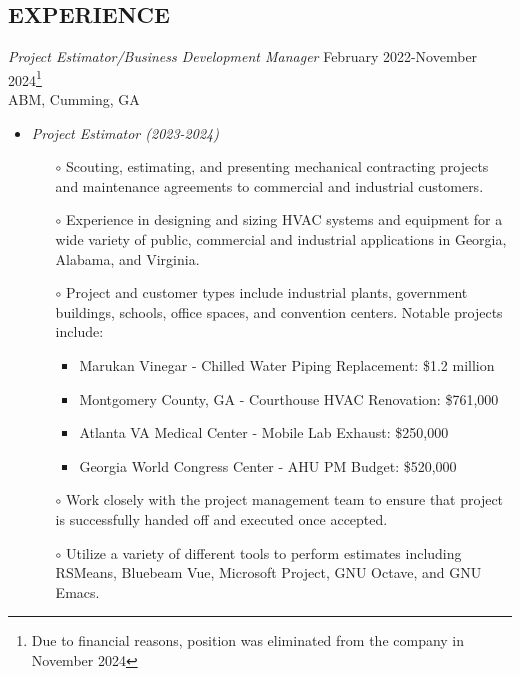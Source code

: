 \documentclass[margin]{res}
\begin{document}
\begin{resume}
\section{EXPERIENCE} 
    {\sl Project Estimator/Business Development Manager} \hfill February 2022-November 2024\footnote{Due to financial reasons, position was eliminated from the company in November 2024} \\
    ABM, Cumming, GA
    \begin{itemize}  \itemsep -2pt %
    \item {\sl Project Estimator (2023-2024)}
      \begin{itemize}
            \item[$\circ$] Scouting, estimating, and presenting mechanical contracting projects and maintenance agreements to commercial and industrial customers.
            \item[$\circ$] Experience in designing and sizing HVAC systems and equipment for a wide variety of public, commercial and industrial applications in Georgia, Alabama, and Virginia.
            \item[$\circ$] Project and customer types include industrial plants, government buildings, schools, office spaces, and convention centers. Notable projects include:
              \begin{itemize}
              \item Marukan Vinegar - Chilled Water Piping Replacement: \$1.2 million
              \item Montgomery County, GA - Courthouse HVAC Renovation: \$761,000
              \item Atlanta VA Medical Center - Mobile Lab Exhaust: \$250,000
              \item Georgia World Congress Center - AHU PM Budget: \$520,000
              \end{itemize}
            \item[$\circ$] Work closely with the project management team to ensure that project is successfully handed off and executed once accepted.
            \item[$\circ$] Utilize a variety of different tools to perform estimates including RSMeans, Bluebeam Vue, Microsoft Project, GNU Octave, and GNU Emacs.

\end{itemize}
\end{itemize}
\end{resume}
\end{document}
